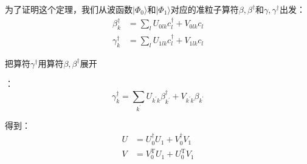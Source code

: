 为了证明这个定理，我们从波函数$|\Phi_{0}\rangle$和$|\Phi_{1}\rangle$对应的准粒子算符$\beta,\beta^{\dagger}$和$\gamma,\gamma^{\dagger}$出发：
\begin{align}
\beta^{\dagger}_{k} & =\sum_{l}U_{0lk}c^{\dagger}_{l}+V_{0lk}c_{l}\label{eq:beta gamma c}\\
\gamma^{\dagger}_{k} & =\sum_{l}U_{1lk}c^{\dagger}_{l}+V_{1lk}c_{l}\nonumber 
\end{align}

把算符$\gamma^{\dagger}$用算符$\beta,\beta^{\dagger}$展开

：
\[
\gamma^{\dagger}_{k}=\sum_{k^{\prime}}U_{k^{\prime}k}\beta^{\dagger}_{k^{\prime}}+V_{k^{\prime}k}\beta_{k^{\prime}}
\]

得到：
\begin{align}
U & =U^{\dagger}_{0}U_{1}+V^{\dagger}_{0}V_{1}\label{eq:UV UV01}\\
V & =V^{\mathrm{T}}_{0}U_{1}+U^{\mathrm{T}}_{0}V_{1}\nonumber 
\end{align}

